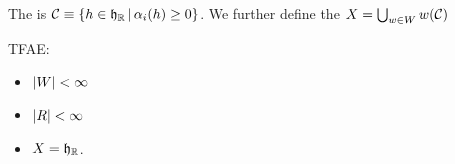\documentclass{article}
\begin{document}
\begin{definition}
The  is $\mathcal{C} \equiv \left\{ h \in \mathfrak{h}_{\mathbb{R}} \, | \, \alpha_i(h) \geq 0 \right\}$. We further define the  $X = \bigcup_{w \in W} w(\mathcal{C})$
\end{definition}

\begin{prop}
TFAE:
\begin{itemize}
    \item $\left\lvert W \right\rvert < \infty $
    \item $\left\lvert R \right\rvert < \infty$ 
    \item $X = \mathfrak{h}_{\mathbb{R}}$. 
\end{itemize}
\end{prop}


\end{document}
